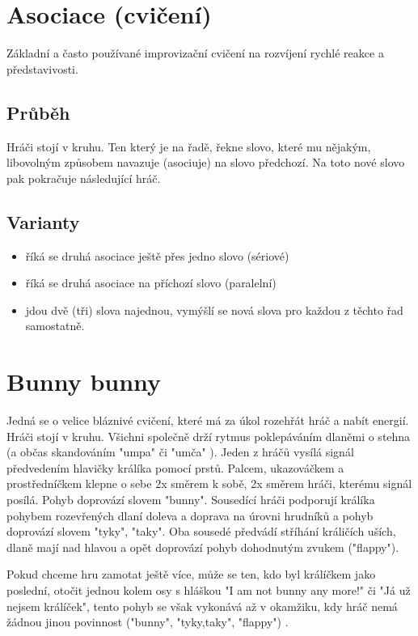 \documentclass[main.tex]{subfiles}
\begin{document}
\needspace{5cm} \section{Asociace (cvičení)} \label{asociace (cvičení)} Základní a často používané improvizační cvičení na rozvíjení rychlé reakce a představivosti. 
 
\subsection{Průběh} Hráči stojí v kruhu. Ten který je na řadě, řekne slovo, které mu nějakým, libovolným způsobem navazuje (asociuje) na slovo předchozí. Na toto nové slovo pak pokračuje následující hráč. 
 
\subsection{Varianty} \begin{itemize}
\item říká se druhá asociace ještě přes jedno slovo (sériové)
\item říká se druhá asociace na příchozí slovo (paralelní)
\item jdou dvě (tři) slova najednou, vymýšlí se nová slova pro každou z těchto řad samostatně.
\end{itemize}
 
 
 
 
 
 
 
\needspace{5cm} \section{Bunny bunny} \label{bunny bunny} Jedná se o velice bláznivé cvičení, které má za úkol rozehřát hráč a nabít energií. Hráči stojí v kruhu. Všichni společně drží rytmus poklepáváním dlaněmi o stehna (a občas skandováním "umpa"{} či "umča"{} ). Jeden z hráčů vysílá signál předvedením hlavičky králíka pomocí prstů. Palcem, ukazováčkem a prostředníčkem klepne o sebe 2x směrem k sobě, 2x směrem hráči, kterému signál posílá. Pohyb doprovází slovem "bunny". Sousedící hráči podporují králíka pohybem rozevřených dlaní doleva a doprava na úrovni hrudníků a pohyb doprovází slovem "tyky", "taky". Oba sousedé předvádí stříhání králičích uších, dlaně mají nad hlavou a opět doprovází pohyb dohodnutým zvukem ("flappy"). 
 
Pokud chceme hru zamotat ještě více, může se ten, kdo byl králíčkem jako poslední, otočit jednou kolem osy s hláškou "I am not bunny any more!"{} či "Já už nejsem králíček", tento pohyb se však vykonává až v okamžiku, kdy hráč nemá žádnou jinou povinnost ("bunny", "tyky,taky", "flappy") . 
 
\end{document}
